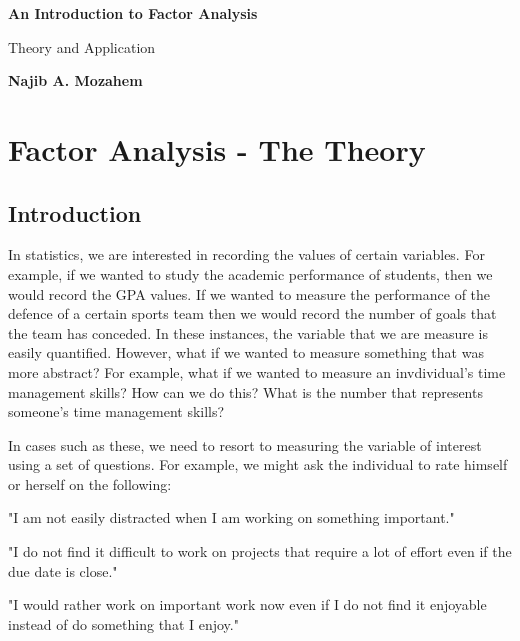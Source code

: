 \documentclass[a4paper,12pt,oneside]{book}
\begin{document}
\begin{titlepage}
    \begin{center}
        \vspace*{1cm}
 
        \Huge
        \textbf{An Introduction to Factor Analysis}
 
        \vspace{0.5cm}
        \LARGE
        Theory and Application
 
        \vspace{1.5cm}
 
        \textbf{Najib A. Mozahem}
 
        \vfill
 
        \vspace{0.8cm}
 
    \end{center}
\end{titlepage}
\tableofcontents
\chapter{Factor Analysis - The Theory}
\section{Introduction}
In statistics, we are interested in recording the values of certain variables. For example, if we wanted to study the academic performance of 
students, then we would record the GPA values. If we wanted to measure the performance of the defence of a certain sports team then we would
record the number of goals that the team has conceded. In these instances, the variable that we are measure is easily quantified. However, what if
we wanted to measure something that was more abstract? For example, what if we wanted to measure an invdividual's time management skills? How can
we do this? What is the number that represents someone's time management skills? 

In cases such as these, we need to resort to measuring the variable of interest using a set of questions. For example, we might ask the individual
to rate himself or herself on the following:

"I am not easily distracted when I am working on something important."

"I do not find it difficult to work on projects that require a lot of effort even if the due date is close."

"I would rather work on important work now even if I do not find it enjoyable instead of do something that I enjoy."
\end{document}
